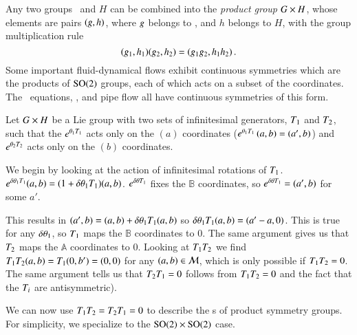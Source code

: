 

Any two groups \Group\ and $H$ can be combined into
the {\em product group} $G \times H$, whose
elements are pairs $(g,h)$, where $g$ belongs to \Group, and
$h$ belongs to $H$, with the group multiplication rule
\[
(g_1,h_1)(g_2,h_2)=(g_1 g_2,h_1 h_2)
\,.
\]
Some important fluid-dynamical flows exhibit continuous symmetries
which are the products of $\textrm{SO}(2)$ groups, each of which acts on
a subset  of the {\statesp} coordinates. The \KS\ equations,
{\pCf}, and pipe
flow all have continuous symmetries of this form.

Let $G \times H$ be a Lie group
with two sets of infinitesimal generators, $T_1$ and $T_2$, such that the
$e^{{\bf \theta}_1 T_1}$ acts only on the $(a)$
coordinates ($e^{{\bf \theta}_1 T_1} \, (a,b)=(a',b)$) and
$e^{{\bf \theta}_2 T_2}$ acts only on the $(b)$
coordinates.

We begin by looking at the action of infinitesimal rotations of $T_1$.
$e^{\delta {\bf \theta}_1 T_1}(a,b)=(1+\delta {\bf \theta}_1 T_1)
(a,b)$. $e^{\delta {\bf \theta} T_1}$ fixes the
$\mathbb{B}$ coordinates, so $e^{\delta {\bf \theta} T_1}=(a',b)$ for some
$a'$.

This results in $(a',b)=(a,b)+\delta {\bf \theta}_1 T_1(a,b)$ so
$\delta {\bf \theta}_1 T_1(a,b)=(a'-a,0)$. This is true for any $\delta
{\bf \theta}_1$, so $T_1$ maps the $\mathbb{B}$ coordinates to 0. The same
argument gives us that $T_2$ maps the $\mathbb{A}$ coordinates to 0.
Looking at $T_1 T_2$ we find $T_1 T_2 (a,b)=T_1 (0,b')=(0,0)$
for any $(a,b) \in {\cal M}$, which is only possible if $T_1
T_2=0$. The same argument tells us that $T_2 T_1=0$ %
follows from $T_1 T_2=0$ and the fact that the $T_i$ are
antisymmetric).

We can now use $T_1 T_2=T_2 T_1=0$ to describe the
{\sset s} of product symmetry groups. For simplicity,
we specialize to the  $\textrm{SO}(2) \times \textrm{SO}(2)$ case.

